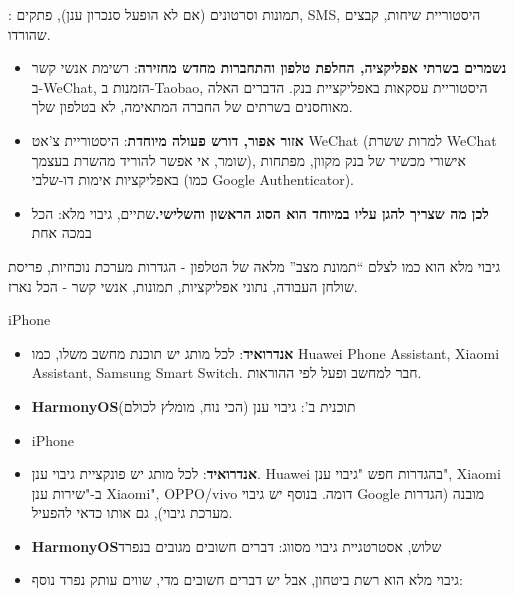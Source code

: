 


: תמונות וסרטונים (אם לא הופעל סנכרון ענן), פתקים, SMS, היסטוריית שיחות, קבצים שהורדו.

\begin{itemize}
  \item \textbf{נשמרים בשרתי אפליקציה, החלפת טלפון והתחברות מחדש מחזירה}: רשימת אנשי קשר ב-WeChat, הזמנות ב-Taobao, היסטוריית עסקאות באפליקציית בנק. הדברים האלה מאוחסנים בשרתים של החברה המתאימה, לא בטלפון שלך.
  \item \textbf{אזור אפור, דורש פעולה מיוחדת}: היסטוריית צ'אט WeChat (למרות ששרת WeChat שומר, אי אפשר להוריד מהשרת בעצמך), אישורי מכשיר של בנק מקוון, מפתחות באפליקציות אימות דו-שלבי (כמו Google Authenticator).
  \item \textbf{לכן מה שצריך להגן עליו במיוחד הוא הסוג הראשון והשלישי.}שתיים, גיבוי מלא: הכל במכה אחת
\end{itemize}

גיבוי מלא הוא כמו לצלם “תמונת מצב” מלאה של הטלפון - הגדרות מערכת נוכחיות, פריסת שולחן העבודה, נתוני אפליקציות, תמונות, אנשי קשר - הכל נארז.


iPhone


\begin{itemize}
  \item \textbf{אנדרואיד}: לכל מותג יש תוכנת מחשב משלו, כמו Huawei Phone Assistant, Xiaomi Assistant, Samsung Smart Switch. חבר למחשב ופעל לפי ההוראות.
  \item \textbf{HarmonyOS}תוכנית ב': גיבוי ענן (הכי נוח, מומלץ לכולם)
  \item iPhone
\end{itemize}


\begin{itemize}
  \item \textbf{אנדרואיד}: לכל מותג יש פונקציית גיבוי ענן. Huawei בהגדרות חפש "גיבוי ענן", Xiaomi ב-"שירות ענן Xiaomi", OPPO/vivo דומה. בנוסף יש גיבוי Google מובנה (הגדרות מערכת גיבוי), גם אותו כדאי להפעיל.
  \item \textbf{HarmonyOS}שלוש, אסטרטגיית גיבוי מסווג: דברים חשובים מגובים בנפרד
  \item גיבוי מלא הוא רשת ביטחון, אבל יש דברים חשובים מדי, שווים עותק נפרד נוסף:
\end{itemize}


